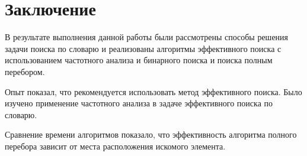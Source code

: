\chapter*{Заключение}

В результате выполнения данной работы были рассмотрены способы решения задачи поиска по словарю и реализованы алгоритмы эффективного поиска с использованием частотного анализа и бинарного поиска и поиска полным перебором. 

Опыт показал, что рекомендуется использовать метод эффективного поиска. Было изучено применение частотного анализа в задаче эффективного поиска по словарю. 

Сравнение времени алгоритмов показало, что эффективность алгоритма полного перебора зависит от места расположения искомого элемента.
